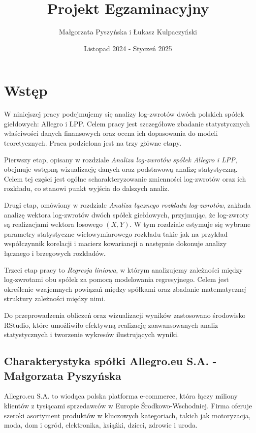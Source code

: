\documentclass[12pt]{article}
\title{Projekt Egzaminacyjny}
\author{Małgorzata Pyszyńska i Łukasz Kulpaczyński}
\date{Listopad 2024 - Styczeń 2025}
\begin{document}
\maketitle

\tableofcontents
\newpage

\section{Wstęp}

W niniejszej pracy podejmujemy się analizy log-zwrotów dwóch polskich spółek giełdowych: Allegro i LPP. Celem pracy jest szczegółowe zbadanie statystycznych właściwości danych finansowych oraz ocena ich dopasowania do modeli teoretycznych. Praca podzielona jest na trzy główne etapy.

Pierwszy etap, opisany w rozdziale \textit{Analiza log-zwrotów spółek Allegro i LPP}, obejmuje wstępną wizualizację danych oraz podstawową analizę statystyczną. Celem tej części jest ogólne scharakteryzowanie zmienności log-zwrotów oraz ich rozkładu, co stanowi punkt wyjścia do dalszych analiz. 

Drugi etap, omówiony w rozdziale \textit{Analiza łącznego rozkładu log-zwrotów}, zakłada analizę wektora log-zwrotów dwóch spółek giełdowych, przyjmując, że log-zwroty są realizacjami wektora losowego $(X, Y)$. W tym rozdziale estymuje się wybrane parametry statystyczne wielowymiarowego rozkładu takie jak na przykład współczynnik korelacji i macierz kowariancji a następnie dokonuje analizy łącznego i brzegowych rozkładów. 

Trzeci etap pracy to \textit{Regresja liniowa}, w którym analizujemy zależności między log-zwrotami obu spółek za pomocą modelowania regresyjnego. Celem jest określenie wzajemnych powiązań między spółkami oraz zbadanie matematycznej struktury zależności między nimi.


Do przeprowadzenia obliczeń oraz wizualizacji wyników zastosowano środowisko RStudio, które umożliwiło efektywną realizację zaawansowanych analiz statystycznych i tworzenie wykresów ilustrujących wyniki. 

\subsection{Charakterystyka spółki Allegro.eu S.A. - Małgorzata Pyszyńska}
Allegro.eu S.A. to wiodąca polska platforma e-commerce, która łączy miliony klientów z tysiącami sprzedawców w Europie Środkowo-Wschodniej. Firma oferuje szeroki asortyment produktów w kluczowych kategoriach, takich jak motoryzacja, moda, dom i ogród, elektronika, książki, dzieci, zdrowie i uroda.
\end{document}
